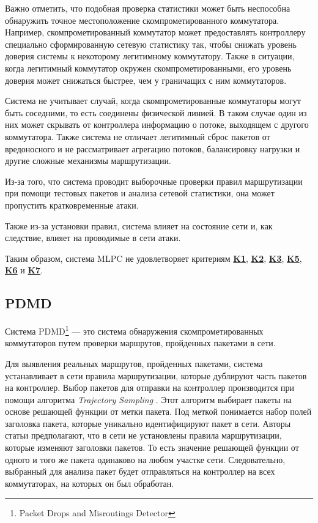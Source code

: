 \documentclass[../thesis.tex]{subfiles}
\begin{document}
Важно отметить, что подобная проверка статистики может быть неспособна обнаружить точное местоположение скомпрометированного коммутатора.
Например, скомпрометированный коммутатор может предоставлять контроллеру специально сформированную сетевую статистику так, чтобы снижать уровень доверия системы к некоторому легитимному коммутатору.
Также в ситуации, когда легитимный коммутатор окружен скомпрометированными, его уровень доверия может снижаться быстрее, чем у граничащих с ним коммутаторов.

Система не учитывает случай, когда скомпрометированные коммутаторы могут быть соседними, то есть соединены физической линией.
В таком случае один из них может скрывать от контроллера информацию о потоке, выходящем с другого коммутатора.
Также система не отличает легитимный сброс пакетов от вредоносного и не рассматривает агрегацию потоков, балансировку нагрузки и другие сложные механизмы маршрутизации.

Из-за того, что система проводит выборочные проверки правил маршрутизации при помощи тестовых пакетов и анализа сетевой статистики, она может пропустить кратковременные атаки.

Также из-за установки правил, система влияет на состояние сети и, как следствие, влияет на проводимые в сети атаки.

{
\hypersetup{linkcolor=black}

Таким образом, система MLPC не удовлетворяет критериям \hyperref[criterion:K1]{\textbf{K1}}, \hyperref[criterion:K2]{\textbf{K2}}, \hyperref[criterion:K3]{\textbf{K3}}, \hyperref[criterion:K5]{\textbf{K5}}, \hyperref[criterion:K6]{\textbf{K6}} и \hyperref[criterion:K7]{\textbf{K7}}.
}

\subsection{PDMD} \label{subsection:system6}

Система PDMD\footnote{Packet Drops and Misroutings Detector} \cite{mohammadi2016detecting} --- это система обнаружения скомпрометированных коммутаторов путем проверки маршрутов, пройденных пакетами в сети.

Для выявления реальных маршрутов, пройденных пакетами, система устанавливает в сети правила маршрутизации, которые дублируют часть пакетов на контроллер.
Выбор пакетов для отправки на контроллер производится при помощи алгоритма \textit{Trajectory Sampling} \cite{duffield2001trajectory}.
Этот алгоритм выбирает пакеты на основе решающей функции от метки пакета.
Под меткой понимается набор полей заголовка пакета, которые уникально идентифицируют пакет в сети.
Авторы статьи предполагают, что в сети не установлены правила маршрутизации, которые изменяют заголовки пакетов.
То есть значение решающей функции от одного и того же пакета одинаково на любом участке сети. 
Следовательно, выбранный для анализа пакет будет отправляться на контроллер на всех коммутаторах, на которых он был обработан.
\end{document}
